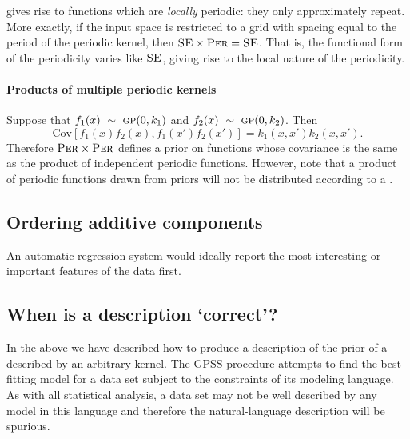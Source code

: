 \documentclass{article}
\begin{document}
gives rise to functions which are \emph{locally} periodic: they only approximately repeat.
More exactly, if the input space is restricted to a grid with spacing equal to the period of the periodic kernel, then ${\textsc{SE}} \times {\textsc{Per}} = {\textsc{SE}}$.
That is, the functional form of the periodicity varies like ${\textsc{SE}}$, giving rise to the local nature of the periodicity.

\paragraph{Products of multiple periodic kernels}

Suppose that ${f_1(x) \ \sim\  {\textsc{gp}}{}(0, k_1)}$ and ${f_2(x) \ \sim\  {\textsc{gp}}{}(0, k_2)}$.
Then
\begin{equation}
{\textrm{Cov} \left[f_1(x)f_2(x), f_1(x')f_2(x') \right] = k_1(x,x')k_2(x,x')}.
\end{equation}
Therefore ${\textsc{Per}} \times {\textsc{Per}}$ defines a prior on functions whose covariance is the same as the product of independent periodic functions.  However, note that a product of periodic functions drawn from \gp{} priors will not be distributed according to a \gp{}.

\subsection{Ordering additive components}


An automatic regression system would ideally report the most interesting or important features of the data first.

\subsection{When is a description `correct'?}

In the above we have described how to produce a description of the prior of a \gp{} described by an arbitrary kernel.
The GPSS procedure attempts to find the best fitting model for a data set subject to the constraints of its modeling language.
As with all statistical analysis, a data set may not be well described by any model in this language and therefore the natural-language description will be spurious.
\end{document}
